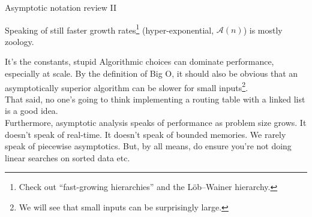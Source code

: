 \documentclass[mathserif,xcolor={dvipsnames,table}]{beamer}
\begin{document}
\begin{frame}{Asymptotic notation review II}
\scriptsize{
\begin{center}
\end{center}
\vfill
Speaking of still faster growth rates\footnote{\scriptsize{Check out ``fast-growing hierarchies'' and the L\"ob–Wainer hierarchy.}} (hyper-exponential, $\mathcal{A}(n)$)
 is mostly zoology.%
}
\end{frame}

\begin{frame}{It's the constants, stupid}
Algorithmic choices can dominate performance, especially at scale. By the
definition of Big O, it should also be obvious that an asymptotically superior
algorithm can be slower for small inputs\footnote{We will see that small inputs can be surprisingly large.}.\\
\vfill
That said, no one's going to think implementing a routing table with a linked list is a good idea.\\
\vfill
Furthermore, asymptotic analysis speaks of performance as problem size grows.
It doesn't speak of real-time. It doesn't speak of bounded memories.
We rarely speak of piecewise asymptotics.
\vfill
But, by all means, do ensure you're not doing linear searches on sorted data etc.
\end{frame}
\end{document}
